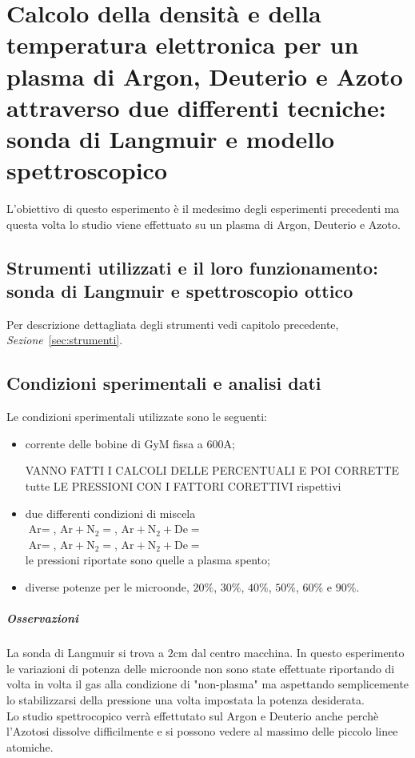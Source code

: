 \chapter{Calcolo della densità e della temperatura elettronica per un plasma di Argon, Deuterio e Azoto attraverso due differenti tecniche: sonda di Langmuir e modello spettroscopico}

L'obiettivo di questo esperimento è il medesimo degli esperimenti precedenti ma questa volta lo studio viene effettuato su un plasma di Argon, Deuterio e Azoto.

\section{Strumenti utilizzati e il loro funzionamento: sonda di Langmuir e spettroscopio ottico}
Per descrizione dettagliata degli strumenti vedi capitolo precedente, \textit{Sezione}~\ref{sec:strumenti}.

\section{Condizioni sperimentali e analisi dati}
Le condizioni sperimentali utilizzate sono le seguenti:
\begin{itemize}
 \item corrente delle bobine di GyM fissa a $600\si{\ampere}$;
 
 VANNO FATTI I CALCOLI DELLE PERCENTUALI E POI CORRETTE tutte LE PRESSIONI CON I FATTORI CORETTIVI rispettivi
 
 \item due differenti condizioni di miscela\\
 $\text{Ar}=  $,  $\text{Ar}+\text{N}_2=  $, $\text{Ar}+\text{N}_2+\text{De}=  $\\
 $\text{Ar}=  $,  $\text{Ar}+\text{N}_2=  $, $\text{Ar}+\text{N}_2+\text{De}=  $\\
 le pressioni riportate sono quelle a plasma spento;
 
 \item diverse potenze per le microonde, $20\%$, $30\%$, $40\%$, $50\%$, $60\%$ e $90\%$.
\end{itemize}


\paragraph{Osservazioni}
La sonda di Langmuir si trova a $2\si{\centi\meter}$ dal centro macchina.
In questo esperimento le variazioni di potenza delle microonde non sono state effettuate riportando di volta in volta il gas alla condizione di "non-plasma" ma aspettando semplicemente lo stabilizzarsi 
della pressione una volta impostata la potenza desiderata.\\
Lo studio spettrocopico verrà effettutato sul Argon e Deuterio anche perchè l'Azotosi dissolve difficilmente e si possono vedere al massimo delle piccolo linee atomiche.

